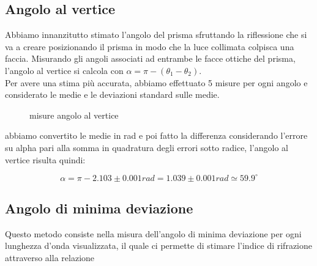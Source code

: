 \documentclass[a4paper]{article}
\theoremstyle{definition}
\begin{document}
\subsection {Angolo al vertice}

Abbiamo innanzitutto stimato l'angolo del prisma sfruttando la riflessione che si va a creare posizionando il prisma in modo che la luce collimata colpisca una faccia. Misurando gli angoli associati ad entrambe le facce ottiche del prisma, l'angolo al vertice si calcola con \(\alpha = \pi - (\theta_{1}-\theta_{2})\).\\

\noindent Per avere una stima più accurata, abbiamo effettuato 5 misure per ogni angolo e considerato le medie e le deviazioni standard sulle medie.


\begin{figure}[!htbp]
		\captionsetup{labelformat=empty}
		\caption{misure angolo al vertice}
	\end{figure}	
	abbiamo convertito le medie in rad e poi fatto la differenza considerando l'errore su alpha pari alla somma in quadratura degli errori sotto radice, l'angolo al vertice risulta quindi:
      
      \[\alpha = \pi - 2.103 \pm0.001rad = 1.039 \pm 0.001 rad \simeq 59.9^{\circ}\]
      
\pagebreak  
      
\subsection{Angolo di minima deviazione}

 Questo metodo consiste nella misura dell'angolo di minima deviazione per ogni lunghezza d'onda visualizzata, il quale ci permette di stimare l'indice di rifrazione attraverso alla relazione 
 
\end{document}
